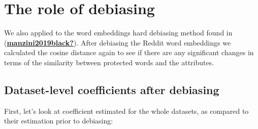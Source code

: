 \documentclass[
  12pt,
]{book}
\begin{document}
\hypertarget{the-role-of-debiasing}{%
\chapter{The role of debiasing}\label{the-role-of-debiasing}}

We also applied to the word embeddings hard debiasing method found in (\protect\hyperlink{ref-manzini2019black}{\textbf{manzini2019black?}}). After debiasing the Reddit word embeddings we calculated the cosine distance again to see if there are any significant changes in terms of the similarity between protected words and the attributes.

\hypertarget{dataset-level-coefficients-after-debiasing}{%
\section{Dataset-level coefficients after debiasing}\label{dataset-level-coefficients-after-debiasing}}

First, let's look at coefficient estimated for the whole datasets, as compared to their estimation prior to debiasing:
\end{document}
